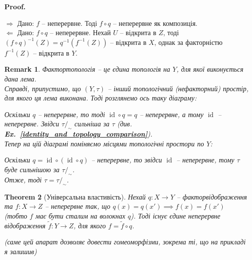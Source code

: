 \documentclass[a4paper, 10pt]{article}
\makeatletter
\def\rightproof{$\boxed{\Rightarrow}$ }
\def\leftproof{$\boxed{\Leftarrow}$ }
\theoremstyle{theoremdd}
\newtheorem{theorem}{Theorem}[subsection]
\newtheorem{remark}[theorem]{Remark}
\newcommand\exref[1]{\textbf{Ex.~\ref{#1}}}
\DeclareMathOperator{\id}{id}
\renewenvironment{proof}[1][Proof.\\]{\par
\pushQED{\hfill \qed}%
\normalfont \topsep6\p@\@plus6\p@\relax
\trivlist
\item\relax
{\bfseries
#1\@addpunct{.}}\hspace\labelsep\ignorespaces
}{%
\popQED\endtrivlist\@endpefalse
}
\makeatother
\begin{document}
\begin{proof}
\rightproof Дано: $f$ -- неперервне. Тоді $f \circ q$ -- неперервне як композиція.
\bigskip \\
\leftproof Дано: $f \circ q$ -- неперервне. Нехай $U$ -- відкрита в $Z$, тоді $(f \circ q)^{-1}(Z) = q^{-1}(f^{-1}(Z))$ -- відкрита в $X$, однак за факторністю $f^{-1}(Z)$ -- відкрита в $Y$.
\end{proof}

\begin{remark}
Фактортопологія -- це єдина топологія на $Y$, для якої виконується дана лема.
\bigskip \\
Справді, припустимо, що $(Y,\tau)$ -- інший топологічний (нефакторний) простір, для якого ця лема виконана. Тоді розглянемо ось таку діаграму:
\begin{figure}[H]
\centering
{}
\end{figure}
\noindent
Оскільки $q$ -- неперервне, то тоді $\id \circ q = q$ -- неперервне, а тому $\id$ -- неперервне. Звідси $\tau/_\sim$ сильніша за $\tau$ (див.~ \exref{identity_and_topology_comparison}).\\
Тепер на цій діаграмі поміняємо місцями топологічні простори по $Y$:
\begin{figure}[H]
\centering
{}
\end{figure}
\noindent
Оскільки $q = \id \circ (\id \circ q)$ -- неперервне, то звідси $\id$ -- неперервне, тому $\tau$ буде сильнішою за $\tau/_\sim$.\\
Отже, тоді $\tau = \tau/_\sim$. 
\end{remark}

\begin{theorem}[Універсальна властивість]
Нехай $q \colon X \to Y$ -- факторвідображення та $f \colon X \to Z$ -- неперервне так, що $q(x) = q(x') \implies f(x) = f(x')$ (тобто $f$ має бути сталим на волокнах $q$). Тоді існує єдине неперервне відображення $\tilde{f} \colon Y \to Z$, для якого $f = \tilde{f} \circ q$.
\begin{figure}[H]
\centering
{}
\end{figure}
\noindent
(\textit{саме цей апарат дозволяє довести гомеоморфізми, зокрема ті, що на прикладі я залишив})
\end{theorem}
\end{document}
